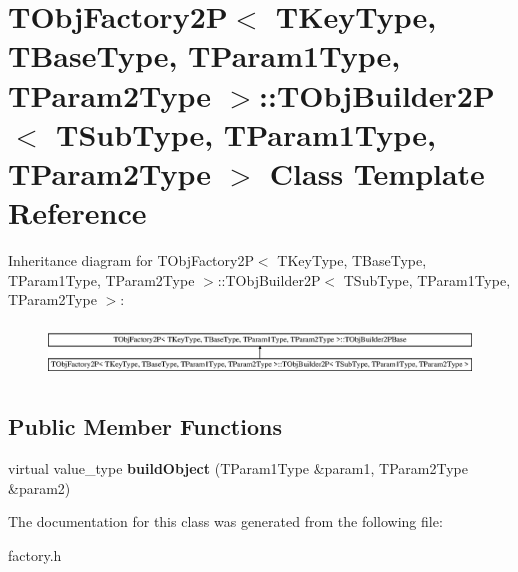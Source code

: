 \hypertarget{class_t_obj_factory2_p_1_1_t_obj_builder2_p}{\section{T\+Obj\+Factory2\+P$<$ T\+Key\+Type, T\+Base\+Type, T\+Param1\+Type, T\+Param2\+Type $>$\+:\+:T\+Obj\+Builder2\+P$<$ T\+Sub\+Type, T\+Param1\+Type, T\+Param2\+Type $>$ Class Template Reference}
\label{class_t_obj_factory2_p_1_1_t_obj_builder2_p}
}
Inheritance diagram for T\+Obj\+Factory2\+P$<$ T\+Key\+Type, T\+Base\+Type, T\+Param1\+Type, T\+Param2\+Type $>$\+:\+:T\+Obj\+Builder2\+P$<$ T\+Sub\+Type, T\+Param1\+Type, T\+Param2\+Type $>$\+:\begin{figure}[H]
\begin{center}
\leavevmode
\includegraphics[height=1.443299cm]{class_t_obj_factory2_p_1_1_t_obj_builder2_p}
\end{center}
\end{figure}
\subsection*{Public Member Functions}
\begin{DoxyCompactItemize}
\item 
\hypertarget{class_t_obj_factory2_p_1_1_t_obj_builder2_p_a4d18813decd9085ad1e8cb79d2c01da2}{virtual value\+\_\+type {\bfseries build\+Object} (T\+Param1\+Type \&param1, T\+Param2\+Type \&param2)}\label{class_t_obj_factory2_p_1_1_t_obj_builder2_p_a4d18813decd9085ad1e8cb79d2c01da2}

\end{DoxyCompactItemize}


The documentation for this class was generated from the following file\+:\begin{DoxyCompactItemize}
\item 
factory.\+h\end{DoxyCompactItemize}
